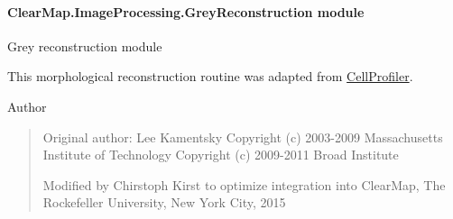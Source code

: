 \documentclass[letterpaper,10pt,english]{sphinxmanual}
\begin{document}
\paragraph{ClearMap.ImageProcessing.GreyReconstruction module}
\label{api/ClearMap.ImageProcessing:clearmap-imageprocessing-greyreconstruction-module}\label{api/ClearMap.ImageProcessing:module-ClearMap.ImageProcessing.GreyReconstruction}
Grey reconstruction module

This morphological reconstruction routine was adapted from
\href{http://www.cellprofiler.org}{CellProfiler}.

Author
\begin{quote}

Original author: Lee Kamentsky
Copyright (c) 2003-2009 Massachusetts Institute of Technology
Copyright (c) 2009-2011 Broad Institute

Modified by Chirstoph Kirst to optimize integration
into ClearMap, The Rockefeller University, New York City, 2015
\end{quote}
\end{document}

